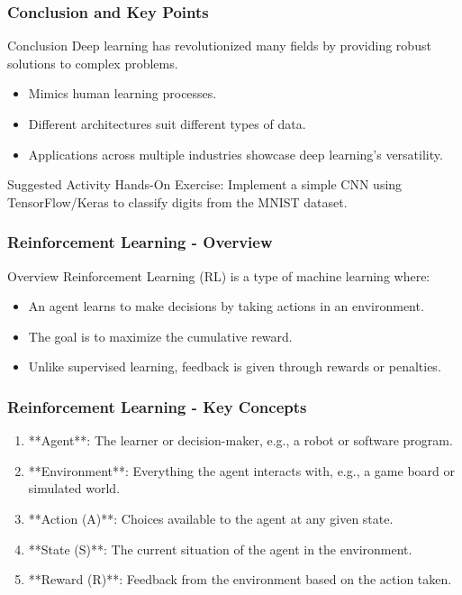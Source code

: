 \documentclass[aspectratio=169]{beamer}
\begin{document}
\begin{frame}[fragile]
    \frametitle{Conclusion and Key Points}
    \begin{block}{Conclusion}
        Deep learning has revolutionized many fields by providing robust solutions to complex problems. 
    \end{block}
    \begin{itemize}
        \item Mimics human learning processes.
        \item Different architectures suit different types of data.
        \item Applications across multiple industries showcase deep learning's versatility.
    \end{itemize}
    \begin{alertblock}{Suggested Activity}
        Hands-On Exercise: Implement a simple CNN using TensorFlow/Keras to classify digits from the MNIST dataset.
    \end{alertblock}
\end{frame}

\begin{frame}[fragile]
    \frametitle{Reinforcement Learning - Overview}
    \begin{block}{Overview}
        Reinforcement Learning (RL) is a type of machine learning where:
        \begin{itemize}
            \item An agent learns to make decisions by taking actions in an environment.
            \item The goal is to maximize the cumulative reward.
            \item Unlike supervised learning, feedback is given through rewards or penalties.
        \end{itemize}
    \end{block}
\end{frame}

\begin{frame}[fragile]
    \frametitle{Reinforcement Learning - Key Concepts}
    \begin{enumerate}
        \item **Agent**: The learner or decision-maker, e.g., a robot or software program.
        \item **Environment**: Everything the agent interacts with, e.g., a game board or simulated world.
        \item **Action (A)**: Choices available to the agent at any given state.
        \item **State (S)**: The current situation of the agent in the environment.
        \item **Reward (R)**: Feedback from the environment based on the action taken.
    \end{enumerate}
\end{frame}
\end{document}
